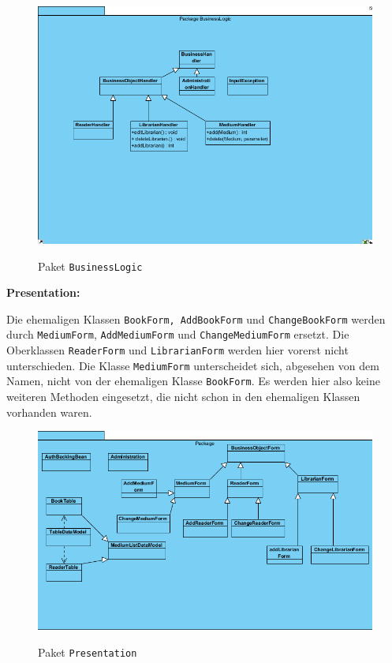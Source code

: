 \documentclass[fontsize=12pt,paper=a4,twoside]{scrartcl}
\begin{document}
\begin{figure} [H] 
\caption{Paket \texttt{BusinessLogic}} \centering
 \includegraphics[width=1\textwidth]{Diagramme/BusinessLogic.png} 
 \label{BusinessLogic} 
\end{figure}

\textbf{Presentation:}

Die ehemaligen Klassen \texttt{BookForm, AddBookForm} und \texttt{ChangeBookForm} werden durch \texttt{MediumForm}, \texttt{AddMediumForm} und \texttt{ChangeMediumForm} ersetzt. Die Oberklassen \texttt{ReaderForm} und \texttt{LibrarianForm} werden hier vorerst nicht unterschieden. Die Klasse \texttt{MediumForm} unterscheidet sich, abgesehen von dem Namen, nicht von der ehemaligen Klasse \texttt{BookForm}. Es werden hier also keine weiteren Methoden eingesetzt, die nicht schon in den ehemaligen Klassen vorhanden waren.

\begin{figure} [H] 
\caption{Paket \texttt{Presentation}} \centering
 \includegraphics[width=1\textwidth]{Diagramme/Presentation.png} 
 \label{Presentation} 
\end{figure}
\end{document}
